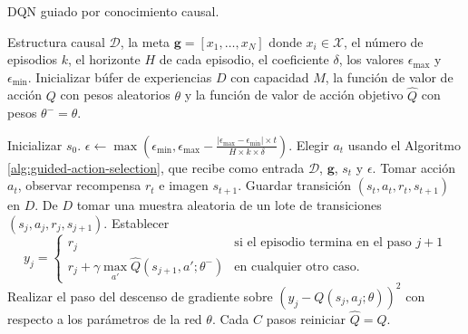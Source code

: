 \begin{mialgoritmo}[H]
  	\caption{DQN guiado por conocimiento causal.}
	\label{alg:dqn-algo-causal}
  \begin{algorithmic}[1]
  \REQUIRE Estructura causal $\mathcal{D}$, la meta $\mathbf{g} = [x_1, \dots, x_N]$ donde $x_i \in \mathcal{X}$, el número de episodios $k$, el horizonte $H$ de cada episodio, el coeficiente $\delta$, los valores $\epsilon_{\max}$ y $\epsilon_{\min}$.
  \STATE Inicializar búfer de experiencias $D$ con capacidad $M$, la función de valor de acción $Q$ con pesos aleatorios $\theta$ y la función de valor de acción objetivo $\hat{Q}$ con pesos $\theta^- = \theta$.
  
    \STATE Inicializar $s_0$.
    \STATE $\epsilon \leftarrow \max(\epsilon_{\min}, \epsilon_{\max} - \frac{|\epsilon_{\max} - \epsilon_{\min}| \times t}{H \times k \times \delta})$.
    \STATE Elegir $a_t$ usando el Algoritmo \ref{alg:guided-action-selection}, que recibe como entrada $\mathcal{D}$, $\mathbf{g}$, $s_t$ y $\epsilon$.
    \STATE Tomar acción $a_t$, observar recompensa $r_{t}$ e imagen $s_{t+1}$.
    \STATE Guardar transición $(s_t, a_t, r_t, s_{t+1})$ en $D$.
    \STATE De $D$ tomar una muestra aleatoria de un lote de transiciones $(s_j, a_j, r_j, s_{j+1})$.
    \STATE Establecer
	\[
	 y_j = 
   \begin{cases} 
      r_j  & \mbox{si el episodio termina en el paso } j + 1 \\
      r_j + \gamma \max_{a'}\hat{Q}(s_{j+1}, a'; \theta^-) & \mbox{en cualquier otro caso.}
   \end{cases}
	\]
	\STATE Realizar el paso del
	descenso de gradiente sobre $(y_j -  Q(s_j,a_j;\theta))^2$ con respecto a los parámetros de la red $\theta$.
	\STATE Cada $C$ pasos reiniciar $\hat{Q} = Q$.
    \ENDFOR
  \ENDFOR
  \end{algorithmic}
\end{mialgoritmo}




